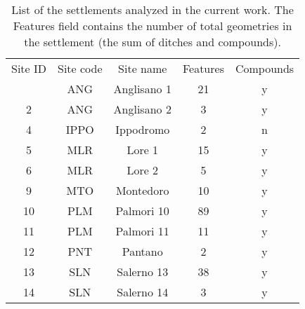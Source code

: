 \begin{table}[!htb]
    \centering
    \begin{tabular}{ccccc}
        \toprule
        Site ID    &    Site code    & Site name            & Features & Compounds \\
        \otoprule
        1          &    ANG          & Anglisano 1          & 21       & y \\
        2          &    ANG          & Anglisano 2          & 3        & y \\
        4          &    IPPO         & Ippodromo            & 2        & n \\
        5          &    MLR          & Lore 1               & 15       & y \\
        6          &    MLR          & Lore 2               & 5        & y \\
        9          &    MTO          & Montedoro            & 10       & y \\
        10         &    PLM          & Palmori 10           & 89       & y \\
        11         &    PLM          & Palmori 11           & 11       & y \\
        12         &    PNT          & Pantano              & 2        & y \\
        13         &    SLN          & Salerno 13           & 38       & y \\
        14         &    SLN          & Salerno 14           & 3        & y \\
        \bottomrule
    \end{tabular}
    \caption[List of the settlements analyzed in the current work]{List of the settlements analyzed in the current work. The \textsf{Features} field contains the number of total geometries in the settlement (the sum of ditches and compounds).
    \label{tab:sites}
    }
\end{table}
